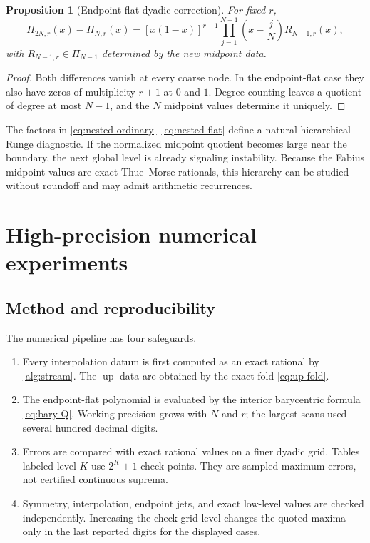 \documentclass[11pt,oneside]{article}
\newtheorem{proposition}[theorem]{Proposition}
\theoremstyle{definition}
\theoremstyle{remark}
\newcommand{\Up}{\operatorname{up}}
\begin{document}
\begin{proposition}[Endpoint-flat dyadic correction]
\label{prop:nested-flat}
For fixed $r$,
\begin{equation}
 H_{2N,r}(x)-H_{N,r}(x)
 =[x(1-x)]^{r+1}
 \prod_{j=1}^{N-1}\left(x-\frac jN\right)R_{N-1,r}(x),
 \label{eq:nested-flat}
\end{equation}
with $R_{N-1,r}\in\Pi_{N-1}$ determined by the new midpoint data.
\end{proposition}

\begin{proof}
Both differences vanish at every coarse node.  In the endpoint-flat case they also have
zeros of multiplicity $r+1$ at $0$ and $1$.  Degree counting leaves a quotient of degree at
most $N-1$, and the $N$ midpoint values determine it uniquely.
\end{proof}

The factors in \eqref{eq:nested-ordinary}--\eqref{eq:nested-flat} define a natural
hierarchical Runge diagnostic.  If the normalized midpoint quotient becomes large near the
boundary, the next global level is already signaling instability.  Because the Fabius
midpoint values are exact Thue--Morse rationals, this hierarchy can be studied without
roundoff and may admit arithmetic recurrences.

\section{High-precision numerical experiments}
\label{sec:numerics}

\subsection{Method and reproducibility}

The numerical pipeline has four safeguards.

\begin{enumerate}
\item Every interpolation datum is first computed as an exact rational by
\cref{alg:stream}.  The $\Up$ data are obtained by the exact fold \eqref{eq:up-fold}.
\item The endpoint-flat polynomial is evaluated by the interior barycentric formula
\eqref{eq:bary-Q}.  Working precision grows with $N$ and $r$; the largest scans used several
hundred decimal digits.
\item Errors are compared with exact rational values on a finer dyadic grid.  Tables labeled
level $K$ use $2^K+1$ check points.  They are sampled maximum errors, not certified continuous
suprema.
\item Symmetry, interpolation, endpoint jets, and exact low-level values are checked
independently.  Increasing the check-grid level changes the quoted maxima only in the last
reported digits for the displayed cases.
\end{enumerate}
\end{document}
